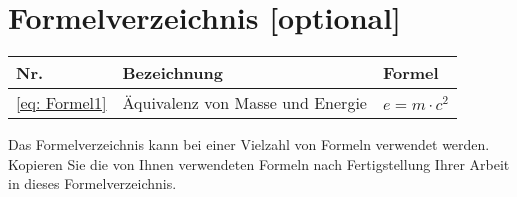 \chapter{Formelverzeichnis [optional]}
\label{sec: Formel}

\begin{table}[h]
	\centering
	\begin{tabular}{|M{0.8cm}|m{2.8cm}|m{10.8cm}|}
		\hline
		\textbf{Nr.} & \textbf{Bezeichnung} & \textbf{Formel} \\
		\hline
		\ref{eq: Formel1} & Äquivalenz von Masse und Energie & $e=m\cdot c^2$ \\ 
		\hline
	\end{tabular}
\end{table}

\noindent Das Formelverzeichnis kann bei einer Vielzahl von Formeln verwendet werden.\\
Kopieren Sie \ggf die von Ihnen verwendeten Formeln nach Fertigstellung Ihrer Arbeit in dieses Formelverzeichnis.